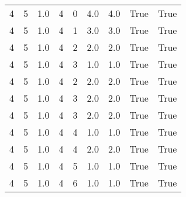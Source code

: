 \documentclass[a4paper,12pt]{article}
\begin{document}
\begin{center}
\begin{tabular}{ c c c | c c c | c | c | c}
        4 & 5 & 1.0 & 4 & 0 & 4.0 & 4.0 & True & True     \\
        4 & 5 & 1.0 & 4 & 1 & 3.0 & 3.0 & True & True     \\
        4 & 5 & 1.0 & 4 & 2 & 2.0 & 2.0 & True & True     \\
        4 & 5 & 1.0 & 4 & 3 & 1.0 & 1.0 & True & True     \\
        4 & 5 & 1.0 & 4 & 2 & 2.0 & 2.0 & True & True     \\
        4 & 5 & 1.0 & 4 & 3 & 2.0 & 2.0 & True & True     \\
        4 & 5 & 1.0 & 4 & 3 & 2.0 & 2.0 & True & True     \\
        4 & 5 & 1.0 & 4 & 4 & 1.0 & 1.0 & True & True     \\
        4 & 5 & 1.0 & 4 & 4 & 2.0 & 2.0 & True & True     \\
        4 & 5 & 1.0 & 4 & 5 & 1.0 & 1.0 & True & True     \\
        4 & 5 & 1.0 & 4 & 6 & 1.0 & 1.0 & True & True     \\
    \end{tabular}
\end{center}
\end{document}

